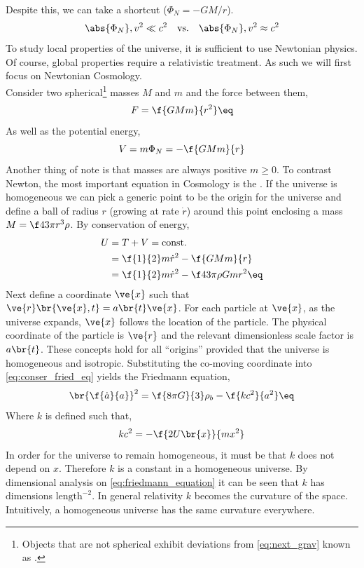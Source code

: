 \documentclass{article}
\begin{document}
Despite this, we can take a shortcut ($\Phi_N = - {GM}/{r}$).
\[ \abs{\Phi_{N}}, v^2 \ll c^2 \quad \text{vs.}\quad \abs{\Phi_{N}}, v^2 \approx c^2 \]
To study local properties of the universe, it is sufficient to use Newtonian physics. Of course, global properties require a relativistic treatment. As such we will first focus on Newtonian Cosmology.\\

Consider two spherical\footnote{Objects that are not spherical exhibit deviations from \cref{eq:next_grav} known as .} masses $M$ and $m$ and the force between them,
\[ F = \f{G M m}{r^2} \eq \label{eq:next_grav} \]
As well as the potential energy,
\[ V = m \Phi_N = -\f{GMm}{r} \]
Another thing of note is that masses are always positive $m \geq 0$. To contrast Newton, the most important equation in Cosmology is the . If the universe is homogeneous we can pick a generic point to be the origin for the universe and define a ball of radius $r$ (growing at rate $\dot{r}$) around this point enclosing a mass $M = \f43 \pi r^3 \rho$. By conservation of energy,
\begin{align*}
U &= T + V = \text{const.} \\
&= \f{1}{2} m \dot{r}^2 - \f{GMm}{r} \\
&= \f{1}{2} m \dot{r}^2 - \f43 \pi \rho G m r^2 \eq \label{eq:conser_fried_eq}
\end{align*}
Next define a  coordinate $\ve{x}$ such that $\ve{r}\br{\ve{x}, t} = a\br{t} \ve{x}$. For each particle at $\ve{x}$, as the universe expands, $\ve{x}$ follows the location of the particle. The physical coordinate of the particle is $\ve{r}$ and the relevant dimensionless scale factor is $a\br{t}$. These concepts hold for all ``origins'' provided that the universe is homogeneous and isotropic. Substituting the co-moving coordinate into \cref{eq:conser_fried_eq} yields the Friedmann equation,
\[ \br{\f{\dot{a}}{a}}^2 = \f{8 \pi G}{3} \rho_b - \f{k c^2}{a^2} \eq \label{eq:friedmann_equation} \]
Where $k$ is defined such that,
\[ k c^2 = - \f{2 U\br{x}}{m x^2} \]
In order for the universe to remain homogeneous, it must be that $k$ does not depend on $x$. Therefore $k$ is a constant in a homogeneous universe. By dimensional analysis on \cref{eq:friedmann_equation} it can be seen that $k$ has dimensions $\text{length}^{-2}$. In general relativity $k$ becomes the curvature of the space. Intuitively, a homogeneous universe has the same curvature everywhere. \\
\end{document}
